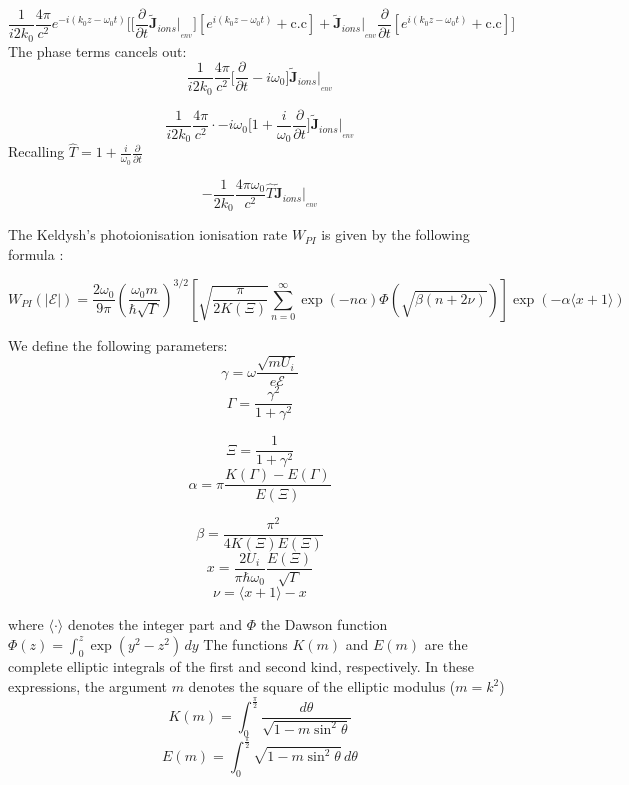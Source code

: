 \documentclass[11pt,a4paper]{article}
\begin{document}
\begin{equation*}
\frac{1}{i2k_0}\frac{4\pi}{c^2}e^{-i(k_0z-\omega_0t)}\Bigg[\Big[\frac{\partial}{\partial t}\tilde{\mathbf{J}}_{ions}\big|_{_{env}}\Big][e^{i(k_0z-\omega_0t)}+\text{c.c}]+\tilde{\mathbf{J}}_{ions}\big|_{_{env}}\frac{\partial}{\partial t}[e^{i(k_0z-\omega_0t)}+\text{c.c}]\Bigg]
\end{equation*}
The phase terms cancels out:
\begin{equation*}
\frac{1}{i2k_0}\frac{4\pi}{c^2}\Bigg[\frac{\partial}{\partial t}-i\omega_0\Bigg]\tilde{\mathbf{J}}_{ions}\big|_{_{env}}
\end{equation*}

\begin{equation*}
\frac{1}{i2k_0}\frac{4\pi}{c^2}\cdot-i\omega_0\Bigg[1+\frac{i}{\omega_0}\frac{\partial}{\partial t}\Bigg]\tilde{\mathbf{J}}_{ions}\big|_{_{env}}
\end{equation*}
Recalling $\hat{T}=1+\frac{i}{\omega_0}\frac{\partial}{\partial t}$

\begin{equation*}
-\frac{1}{2k_0}\frac{4\pi\omega_0}{c^2}\hat{T}\tilde{\mathbf{J}}_{ions}\big|_{_{env}}
\end{equation*}

The Keldysh's photoionisation ionisation rate $W_{PI}$ is given by the following formula :

$$W_{PI}(\mathcal{|E|}) = \frac{2\omega_0}{9\pi} \left( \frac{\omega_0 m}{\hbar \sqrt{\Gamma}} \right)^{3/2} \left[ \sqrt{\frac{\pi}{2K(\Xi)}} \sum_{n=0}^{\infty} \exp(-n\alpha) \Phi(\sqrt{\beta(n+2\nu)}) \right] \exp(-\alpha\langle x+1\rangle)$$

We define the following parameters:
$$\gamma = \omega\frac{\sqrt{mU_i}}{e\mathcal{E}}$$
$$\Gamma = \frac{\gamma^2}{1+\gamma^2}$$

$$\Xi = \frac{1}{1+\gamma^2}$$
$$\alpha = \pi \frac{K(\Gamma) - E(\Gamma)}{E(\Xi)}$$

$$\beta = \frac{\pi^2}{4K(\Xi)E(\Xi)}$$
$$x = \frac{2U_i}{\pi \hbar \omega_0} \frac{E(\Xi)}{\sqrt{\Gamma}}$$
$$\nu = \langle x+1\rangle - x$$

where $\langle \cdot \rangle$ denotes the integer part and $\Phi$ the Dawson function $\Phi(z) = \int_{0}^{z} \exp(y^2 - z^2) \, dy$
The functions $K(m)$ and $E(m)$ are the complete elliptic integrals of the first and second kind, respectively. In these expressions, the argument $m$ denotes the square of the elliptic modulus ($m = k^2$)
$$K(m) = \int_{0}^{\frac{\pi}{2}} \frac{d\theta}{\sqrt{1 - m \sin^2\theta}}$$
$$E(m) = \int_{0}^{\frac{\pi}{2}} \sqrt{1 - m \sin^2\theta} \, d\theta$$
\end{document}
